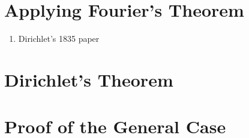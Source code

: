 \noindent\td 

\section{Applying Fourier's Theorem}

\td

\begin{enumerate}
    \item Dirichlet's 1835 paper
\end{enumerate}

\noindent\td 

\section{Dirichlet's Theorem}

\td 

\section{Proof of the General Case}

\td 
